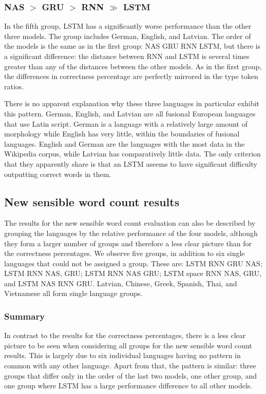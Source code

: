 \documentclass[11pt,a4paper,twoside,openright]{scrbook}
\begin{document}
\subsubsection{NAS $>$ GRU $>$ RNN $\gg$ LSTM}
In the fifth group, LSTM has a significantly worse performance than the other three models. The group includes German, English, and Latvian. The order of the models is the same as in the first group: NAS GRU RNN LSTM, but there is a significant difference: the distance between RNN and LSTM is several times greater than any of the distances between the other models. As in the first group, the differences in correctness percentage are perfectly mirrored in the type token ratios. 

There is no apparent explanation why these three languages in particular exhibit this pattern. German, English, and Latvian are all fusional European languages that use Latin script. German is a language with a relatively large amount of morphology while English has very little, within the boundaries of fusional languages. English and German are the languages with the most data in the Wikipedia corpus, while Latvian has comparatively little data. The only criterion that they apparently share is that an LSTM aseems to have significant difficulty outputting correct words in them. 

\subsection{New sensible word count results}
The results for the new sensible word count evaluation can also be described by grouping the languages by the relative performance of the four models, although they form a larger number of groups and therefore a less clear picture than for the correctness percentages. We observe five groups, in addition to six single languages that could not be assigned a group. These are: LSTM RNN GRU NAS; LSTM RNN NAS, GRU; LSTM RNN NAS GRU; LSTM space RNN NAS, GRU, and LSTM NAS RNN GRU. Latvian, Chinese, Greek, Spanish, Thai, and Vietnamese all form single language groups. 

\subsubsection{Summary}
In contrast to the results for the correctness percentages, there is a less clear picture to be seen when considering all groups for the new sensible word count results. This is largely due to six individual languages having no pattern in common with any other language. Apart from that, the pattern is similar: three groups that differ only in the order of the last two models, one other group, and one group where LSTM has a large performance difference to all other models. 
\end{document}
